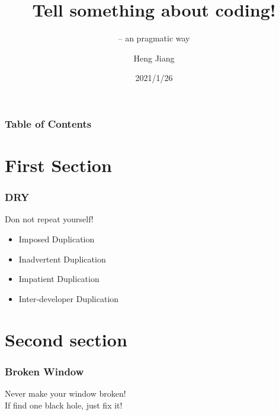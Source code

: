 \documentclass{beamer}
\title[About Coding] %
{\huge Tell something about coding!}
\subtitle{-- an pragmatic way}
\author[hjiang] %
{Heng Jiang\inst{1}}
\institute[VFU] %
{
  \inst{1}%
  Department of Exchange Development\\
  Shanghai Stock Exchange
}
\date[COD 2021]
{2021/1/26}
\begin{document}
\frame{\titlepage}

\begin{frame}
\frametitle{Table of Contents}
\tableofcontents
\end{frame}

\section{First Section}

\begin{frame}
\frametitle{DRY}
Don not repeat yourself!
\begin{itemize}
    \item<1-> Imposed Duplication            
    \item<2-> Inadvertent Duplication        %
    \item<3-> Impatient Duplication          %
    \item<4-> Inter-developer Duplication    %
\end{itemize}
\end{frame}

\section{Second section}

\begin{frame}
\frametitle{Broken Window}
Never make your window broken! \\
If find one black hole, just fix it!
\end{frame}
\end{document}
